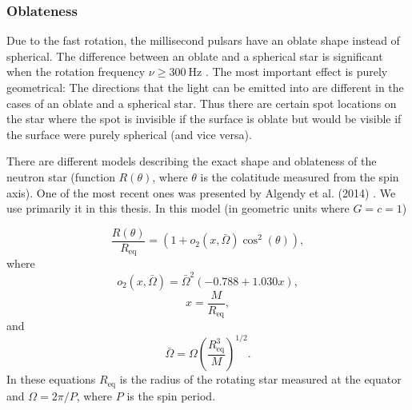 \documentclass{wihuri}
\begin{document}
\subsubsection{Oblateness}

Due to the fast rotation, the millisecond pulsars have an oblate shape instead of spherical. The difference between an oblate and a spherical star is significant when the rotation frequency $\nu \ge 300 ~\mathrm{Hz}$ \cite{cadeau}%
. The most important effect is purely geometrical: The directions that the light can be emitted into are different in the cases of an oblate and a spherical star. Thus there are certain spot locations on the star where the spot is invisible if the surface is oblate but would be visible if the surface were purely spherical (and vice versa).


There are different models describing the exact shape and oblateness of the neutron star (function $R(\theta)$, where $\theta$ is the colatitude measured from the spin axis).
One of the most recent ones was presented by Algendy et al. (2014) \cite{algendy}. 
We use primarily it in this thesis. In this model (in geometric units
where $G = c = 1$)

\begin{equation}
\label{rtheta2}
\frac{R(\theta)}{R_{\mathrm{eq}}} = (1 + o_{2}(x,\bar{\Omega})\cos^{2}(\theta)),
\end{equation}
where
\begin{equation}
\label{otwo}
o_{2}(x,\bar{\Omega}) = \bar{\Omega}^{2}(-0.788+1.030x),
\end{equation}
\begin{equation}
\label{rtheta2x}
x = \frac{M}{R_{\mathrm{eq}}},
\end{equation}
and
\begin{equation}
\label{rtheta2omega}
\bar{\Omega} = \Omega \left(\frac{R_{\mathrm{eq}}^{3}}{M} \right)^{1/2}.
\end{equation}
In these equations $R_{\mathrm{eq}}$ is the radius of the rotating star measured at the equator and $\Omega = 2\pi/P$, where $P$ is the spin period. %
\end{document}
